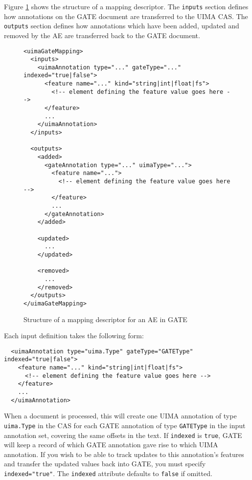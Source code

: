 Figure \ref{fig:mappingFile} shows the structure of a mapping descriptor.  The
\texttt{inputs} section defines how annotations on the GATE document are
transferred to the UIMA CAS.  The \texttt{outputs} section defines how
annotations which have been added, updated and removed by the AE are
transferred back to the GATE document.
\begin{figure}
\begin{small}
\begin{verbatim}
<uimaGateMapping>
  <inputs>
    <uimaAnnotation type="..." gateType="..." indexed="true|false">
      <feature name="..." kind="string|int|float|fs">
        <!-- element defining the feature value goes here -->
      </feature>
      ...
    </uimaAnnotation>
  </inputs>

  <outputs>
    <added>
      <gateAnnotation type="..." uimaType="...">
        <feature name="...">
          <!-- element defining the feature value goes here -->
        </feature>
        ...
      </gateAnnotation>
    </added>
    
    <updated>
      ...
    </updated>
    
    <removed>
      ...
    </removed>
  </outputs>
</uimaGateMapping>
\end{verbatim}
\end{small}
\caption{Structure of a mapping descriptor for an AE in GATE}
\label{fig:mappingFile}
\end{figure}


Each input definition takes the following form:
\begin{small}
\begin{verbatim}
  <uimaAnnotation type="uima.Type" gateType="GATEType" indexed="true|false">
    <feature name="..." kind="string|int|float|fs">
      <!-- element defining the feature value goes here -->
    </feature>
    ...
  </uimaAnnotation>
\end{verbatim}
\end{small}
%
When a document is processed, this will create one UIMA annotation of type
\texttt{uima.Type} in the CAS for each GATE annotation of type
\texttt{GATEType} in the input annotation set, covering the same offsets in the
text.  If \texttt{indexed} is \texttt{true}, GATE will keep a record of which
GATE annotation gave rise to which UIMA annotation.  If you wish to be able to
track updates to this annotation's features and transfer the updated values
back into GATE, you must specify \texttt{indexed="true"}.  The \texttt{indexed}
attribute defaults to \texttt{false} if omitted.

